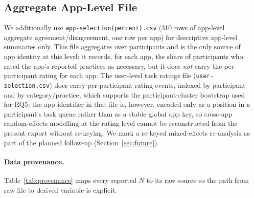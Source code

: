 \documentclass[11pt,a4paper]{article}
\begin{document}
\subsection{Aggregate App-Level File}
\label{subsec:app-level}

We additionally use \texttt{app-selection(percent).csv} (310 rows of
app-level aggregate agreement/disagreement, one row per app) for
descriptive app-level summaries only. This file aggregates over
participants and is the only source of app identity at this level: it
records, for each app, the share of participants who rated the app's
reported practices as necessary, but it does \emph{not} carry the
per-participant rating for each app. The user-level task ratings file
(\texttt{user-selection.csv}) does carry per-participant rating events,
indexed by participant and by category/practice, which supports the
participant-cluster bootstrap used for RQ5; the app identifier in that
file is, however, encoded only as a position in a participant's task
queue rather than as a stable global app key, so cross-app
random-effects modelling at the rating level cannot be reconstructed
from the present export without re-keying. We mark a re-keyed
mixed-effects re-analysis as part of the planned follow-up
(Section~\ref{sec:future}).

\paragraph{Data provenance.} Table~\ref{tab:provenance} maps every
reported $N$ to its raw source so the path from raw file to derived
variable is explicit.
\end{document}
